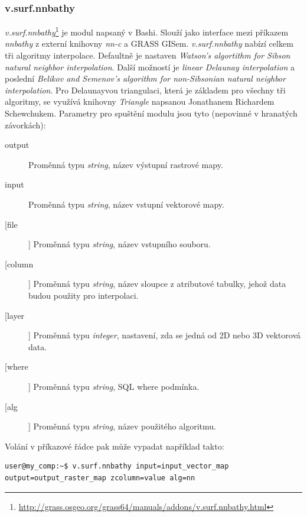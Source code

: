 \documentclass[12pt,a4paper]{article}
\begin{document}
{\subsubsection{v.surf.nnbathy}
\emph{v.surf.nnbathy}\footnote{\url{http://grass.osgeo.org/grass64/manuals/addons/v.surf.nnbathy.html}}
je modul napsaný v Bashi. Slouží jako interface mezi příkazem \emph{nnbathy} z
externí knihovny \emph{nn-c} a GRASS GISem. \emph{v.surf.nnbathy}
nabízí celkem tři algoritmy interpolace. Defaultně je nastaven
\emph{Watson's algortithm for Sibson natural neighbor
  interpolation}. Další možností je \emph{linear Delaunay
  interpolation} a poslední \emph{Belikov and Semenov's algorithm for
  non-Sibsonian natural neighbor interpolation}. Pro Delaunayvou
triangulaci, která je základem pro všechny tři algoritmy, se využívá
knihovny \emph{Triangle} napsanou Jonathanem Richardem
Schewchukem. Parametry pro spuštění modulu jsou tyto (nepovinné v
hranatých závorkách):

\begin{description}
\item[output] Proměnná typu \emph{string}, název výstupní rastrové mapy.
\item[input] Proměnná typu \emph{string}, název vstupní vektorové mapy.
\item[[file]] Proměnná typu \emph{string}, název vstupního souboru.
\item[[column]] Proměnná typu \emph{string}, název sloupce z atributové tabulky, jehož data budou použity pro interpolaci.
\item[[layer]] Proměnná typu \emph{integer}, nastavení, zda se jedná od 2D nebo 3D vektorová data.
\item[[where]] Proměnná typu \emph{string}, SQL where podmínka.
\item[[alg]] Proměnná typu \emph{string}, název použitého algoritmu.
\end{description}

\bigskip

Volání v příkazové řádce pak může vypadat například takto:
\begin{lstlisting}[caption={bash version}]
user@my_comp:~$ v.surf.nnbathy input=input_vector_map output=output_raster_map zcolumn=value alg=nn
\end{lstlisting}

}
\end{document}
